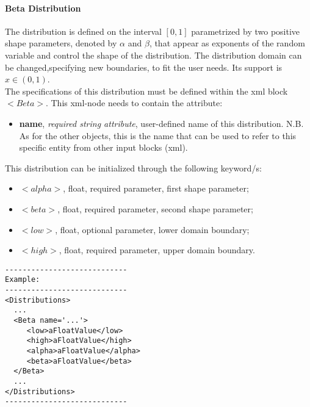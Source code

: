 \paragraph{Beta Distribution}
\label{Beta}
The  distribution is defined on the interval $[0, 1]$ parametrized by two positive shape parameters, denoted by $\alpha$ and $\beta$, that appear as exponents of the random variable and control the shape of the distribution. The distribution domain  can be changed,specifying new boundaries, to fit the user needs.  Its support is $x \in (0, 1)$.
\\ The specifications of this distribution must be defined within the xml block $<Beta>$. This xml-node needs to contain the attribute:
\vspace{-5mm}
\begin{itemize}
\itemsep0em
\item \textbf{name}, \textit{required string attribute}, user-defined name of this distribution. N.B. As for the other objects, this is the name that can be used to refer to this specific entity from other input blocks (xml).   
\end{itemize}
\vspace{-5mm}
This distribution can be initialized through the following keyword/s:
\begin{itemize}
\item $<alpha>$, float, required parameter, first shape parameter;
\item $<beta>$, float, required parameter, second shape parameter;
\item $<low>$, float, optional parameter,  lower domain boundary;  
\item $<high>$, float, required parameter, upper domain boundary.
\end{itemize}

\begin{lstlisting}[style=XML]
----------------------------
Example:
----------------------------
<Distributions>
  ...
  <Beta name='...'>
     <low>aFloatValue</low>
     <high>aFloatValue</high>
     <alpha>aFloatValue</alpha>
     <beta>aFloatValue</beta>
  </Beta>
  ...
</Distributions>
----------------------------
\end{lstlisting}



